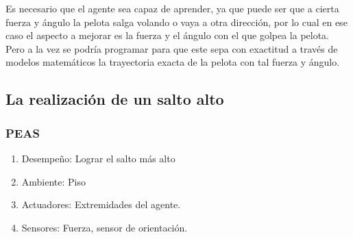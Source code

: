 \documentclass{article}
\begin{document}
                Es necesario que el agente sea capaz de aprender, ya que puede ser que a cierta fuerza y ángulo la pelota salga volando o vaya a otra dirección, por lo cual en ese caso el aspecto a mejorar es la fuerza y el ángulo con el que golpea la pelota. Pero a la vez se podría programar para que este sepa con exactitud a través de modelos matemáticos la trayectoria exacta de la pelota con tal fuerza y ángulo.

        \subsection{La realización de un salto alto}
            \subsubsection{PEAS}
                \begin{enumerate}
                    \item Desempeño: Lograr el salto más alto
                    \item Ambiente: Piso 
                    \item Actuadores: Extremidades del agente. 
                    \item Sensores: Fuerza, sensor de orientación.
                \end{enumerate}
\end{document}
